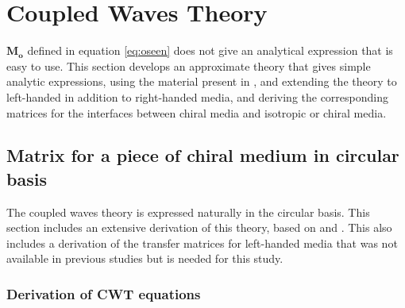 \section{Coupled Waves Theory}
\label{sec:cwt}
$\bm{M_o}$ defined in equation \ref{eq:oseen} does not give an analytical expression that is easy to use. This section develops an approximate theory that gives simple analytic expressions, using the material present in \cite{mccall_properties_2009}, and extending the theory to left-handed in addition to right-handed media, and deriving the corresponding matrices for the interfaces between chiral media and isotropic or chiral media.
\subsection{Matrix for a piece of chiral medium in circular basis}
The coupled waves theory is expressed naturally in the circular basis. This section includes an extensive derivation of this theory, based on \cite{mccall_photonics_2020} and \cite{mccall_simplified_2009}. This also includes a derivation of the transfer matrices for left-handed media that was not available in previous studies\cite{mccall_simplified_2009}\cite{mccall_properties_2009} but is needed for this study.

\subsubsection{Derivation of CWT equations}

